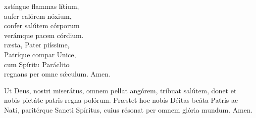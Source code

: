 \vspace{0,5cm}



\vspace{0.15cm}


\def\greinitialformat#1{{\fontsize{45}{45}\selectfont #1}}

\vspace{0.3cm}


\vspace{0.15cm}

\def\greinitialformat#1{{\fontsize{40}{40}\selectfont #1}}

\vspace{0.3cm}


\vspace{0.15cm}

\def\greinitialformat#1{{\fontsize{40}{40}\selectfont #1}}


\vspace{0.3cm}


\vspace{0.15cm}

\def\greinitialformat#1{{\fontsize{40}{40}\selectfont #1}}

\begin{multicols}{2}

\noindent{}xstíngue flammas lítium,\\
aufer calórem nóxium, \\
confer salútem córporum\\
verámque pacem córdium.\\

\noindent{}ræsta, Pater piíssime,\\ 
Patríque compar Unice, \\
cum Spíritu Paráclito\\
regnans per omne s\'{æ}culum. Amen.\\

\end{multicols}

\vspace{0,5cm}

Ut Deus, nostri miserátus, omnem
pellat angórem, tríbuat salútem, 
donet et nobis pietáte patris
	regna polórum.
Præstet hoc nobis Déitas beáta
Patris ac Nati, paritérque Sancti
Spíritus, cuius résonat per omnem
	glória mundum. Amen.

\newpage